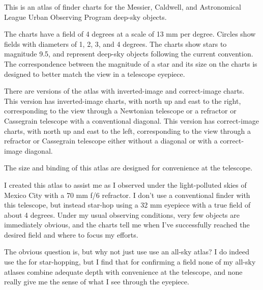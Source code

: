 This is an atlas of finder charts for the Messier, Caldwell, and Astronomical League Urban Observing Program deep-sky objects. 

The charts have a field of 4 degrees at a scale of 13 mm per degree. Circles show fields with diameters of 1, 2, 3, and 4 degrees. The charts show stars to magnitude 9.5, and represent deep-sky objects following the current convention. The correspondence between the magnitude of a star and its size on the charts is designed to better match the view in a telescope eyepiece.


There are versions of the atlas with inverted-image and correct-image charts. 
\ifinverted
This version has inverted-image charts, with north up and east to the right, corresponding to the view through a Newtonian telescope or a refractor or Cassegrain telescope with a conventional diagonal.
\else
This version has correct-image charts, with north up and east to the left, corresponding to the view through a refractor or Cassegrain telescope either without a diagonal or with a correct-image diagonal.
\fi

The size and binding of this atlas are designed for convenience at the telescope.

\clearpage

I created this atlas to assist me as I observed under the light-polluted skies of Mexico City with a 70 mm f/6 refractor. I don't use a conventional finder with this telescope, but instead star-hop using a 32 mm eyepiece with a true field of about 4 degrees. Under my usual observing conditions, very few objects are immediately obvious, and the charts tell me when I've successfully reached the desired field and where to focus my efforts. 

The obvious question is, but why not just use use an all-sky atlas? I do indeed use the {\PSA} for star-hopping, but I find that for confirming a field none of my all-sky atlases combine adequate depth with convenience at the telescope, and none really give me the sense of what I see through the eyepiece. 


